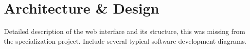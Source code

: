 
\chapter{Architecture \& Design}

Detailed description of the web interface and its structure, this was missing from the specialization project.
Include several typical software development diagrams.

\cleardoublepage